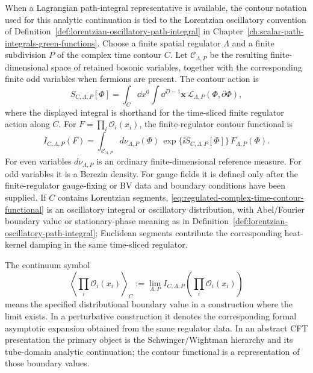 \begin{definition}
\label{def:cft-contour-path-integral-status}
When a Lagrangian path-integral representative is available, the contour
notation used for this analytic continuation is tied to the Lorentzian
oscillatory convention of
Definition~\ref{def:lorentzian-oscillatory-path-integral} in
Chapter~\ref{ch:scalar-path-integrals-green-functions}.  Choose a finite
spatial regulator \(\Lambda\) and a finite subdivision \(P\) of the complex
time contour \(C\).  Let \(\mathcal C_{\Lambda,P}\) be the resulting
finite-dimensional space of retained bosonic variables, together with the
corresponding finite odd variables when fermions are present.  The contour
action is
\[
  S_{C,\Lambda,P}[\Phi]
  =
  \int_C \dd x^0\int\dd^{D-1}\mathbf x\,
  \mathcal L_{\Lambda,P}(\Phi,\partial\Phi),
\]
where the displayed integral is shorthand for the time-sliced finite
regulator action along \(C\).  For
\(F=\prod_i\mathcal O_i(x_i)\), the finite-regulator contour functional is
\begin{equation}
  I_{C,\Lambda,P}(F)
  =
  \int_{\mathcal C_{\Lambda,P}}
  d\nu_{\Lambda,P}(\Phi)\,
  \exp\{\ii S_{C,\Lambda,P}[\Phi]\}\,
  F_{\Lambda,P}(\Phi).
  \label{eq:regulated-complex-time-contour-functional}
\end{equation}
For even variables \(d\nu_{\Lambda,P}\) is an ordinary finite-dimensional
reference measure.  For odd variables it is a Berezin density.  For gauge
fields it is defined only after the finite-regulator gauge-fixing or BV data
and boundary conditions have been supplied.  If \(C\) contains Lorentzian
segments, \eqref{eq:regulated-complex-time-contour-functional} is an
oscillatory integral or oscillatory distribution, with Abel/Fourier boundary
value or stationary-phase meaning as in
Definition~\ref{def:lorentzian-oscillatory-path-integral}; Euclidean segments
contribute the corresponding heat-kernel damping in the same time-sliced
regulator.

The continuum symbol
\begin{equation}
  \left\langle\prod_i\mathcal O_i(x_i)\right\rangle_C
  :=
  \lim_{\Lambda,P}
  I_{C,\Lambda,P}
  \!\left(\prod_i\mathcal O_i(x_i)\right)
  \label{eq:complex-time-contour-continuum-symbol}
\end{equation}
means the specified distributional boundary value in a construction where the
limit exists.  In a perturbative construction it denotes the corresponding
formal asymptotic expansion obtained from the same regulator data.  In an
abstract CFT presentation the primary object is the Schwinger/Wightman
hierarchy and its tube-domain analytic continuation; the contour functional
is a representation of those boundary values.
\end{definition}

